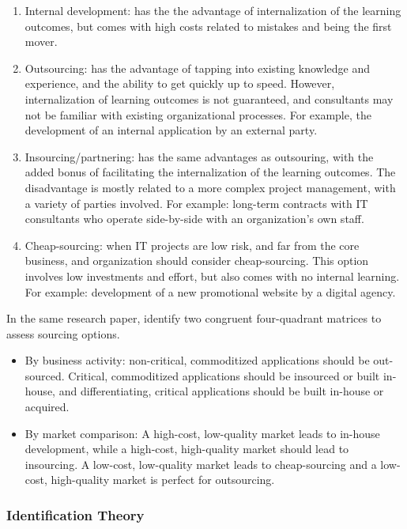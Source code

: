 \documentclass[12pt]{article}
\providecommand{\tightlist}{%
  \setlength{\itemsep}{0pt}\setlength{\parskip}{0pt}}
\begin{document}
\begin{enumerate}
\def\labelenumi{\arabic{enumi}.}
\tightlist
\item
  Internal development: has the the advantage of internalization of the
  learning outcomes, but comes with high costs related to mistakes and
  being the first mover.
\item
  Outsourcing: has the advantage of tapping into existing knowledge and
  experience, and the ability to get quickly up to speed. However,
  internalization of learning outcomes is not guaranteed, and
  consultants may not be familiar with existing organizational
  processes. For example, the development of an internal application by
  an external party.
\item
  Insourcing/partnering: has the same advantages as outsouring, with the
  added bonus of facilitating the internalization of the learning
  outcomes. The disadvantage is mostly related to a more complex project
  management, with a variety of parties involved. For example: long-term
  contracts with IT consultants who operate side-by-side with an
  organization's own staff.
\item
  Cheap-sourcing: when IT projects are low risk, and far from the core
  business, and organization should consider cheap-sourcing. This option
  involves low investments and effort, but also comes with no internal
  learning. For example: development of a new promotional website by a
  digital agency.
\end{enumerate}

In the same research paper, \citet[188-189]{willcocks2003} identify two
congruent four-quadrant matrices to assess sourcing options.

\begin{itemize}
\tightlist
\item
  By business activity: non-critical, commoditized applications should
  be out-sourced. Critical, commoditized applications should be
  insourced or built in-house, and differentiating, critical
  applications should be built in-house or acquired.
\item
  By market comparison: A high-cost, low-quality market leads to
  in-house development, while a high-cost, high-quality market should
  lead to insourcing. A low-cost, low-quality market leads to
  cheap-sourcing and a low-cost, high-quality market is perfect for
  outsourcing.
\end{itemize}

\hypertarget{identification-theory}{%
\subsubsection{Identification Theory}\label{identification-theory}}
\end{document}

